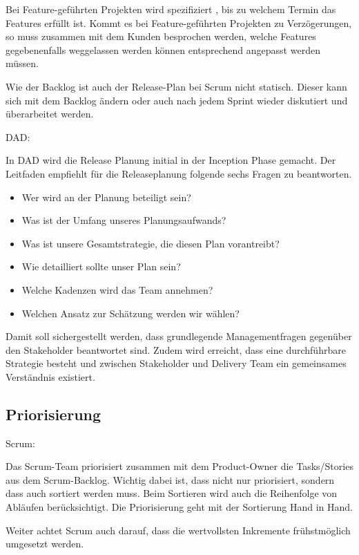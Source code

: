 Bei Feature-geführten Projekten wird spezifiziert , bis zu welchem Termin das Features erfüllt ist. Kommt es bei Feature-geführten Projekten zu Verzögerungen, so muss zusammen mit dem Kunden besprochen werden, welche Features gegebenenfalls weggelassen werden können entsprechend angepasst werden müssen.\smallskip

Wie der Backlog ist auch der Release-Plan bei Scrum nicht statisch. Dieser kann sich mit dem Backlog ändern oder auch nach jedem Sprint wieder diskutiert und überarbeitet werden.
\bigskip 

{\Large DAD:} \cite{planningReleaseDad} \medskip

In DAD wird die Release Planung initial in der Inception Phase gemacht. Der Leitfaden empfiehlt für die Releaseplanung folgende sechs Fragen zu beantworten.
\begin{itemize}
	\item Wer wird an der Planung beteiligt sein?
	\item Was ist der Umfang unseres Planungsaufwands?
	\item Was ist unsere Gesamtstrategie, die diesen Plan vorantreibt?
    \item Wie detailliert sollte unser Plan sein?
    \item Welche Kadenzen wird das Team annehmen?
    \item Welchen Ansatz zur Schätzung werden wir wählen?
\end{itemize}
Damit soll sichergestellt werden, dass grundlegende Managementfragen gegenüber den Stakeholder beantwortet sind. Zudem wird erreicht, dass eine durchführbare Strategie besteht und zwischen Stakeholder und Delivery Team ein gemeinsames Verständnis existiert.


\subsection{Priorisierung}

{\Large Scrum:} \cite{planningPrioScrum} \medskip

Das Scrum-Team priorisiert zusammen mit dem Product-Owner die Tasks/Stories aus dem Scrum-Backlog. Wichtig dabei ist, dass nicht nur priorisiert, sondern dass auch sortiert werden muss. Beim Sortieren wird auch die Reihenfolge von Abläufen berücksichtigt. Die Priorisierung geht mit der Sortierung Hand in Hand. \smallskip

Weiter achtet Scrum auch darauf, dass die wertvollsten Inkremente frühstmöglich umgesetzt werden.\bigskip 

